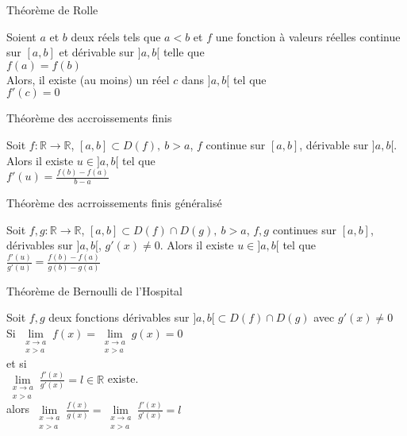 \documentclass[12pt]{article}
\newcommand*{\xfield}[1]{\begin{mdframed}\centering #1\end{mdframed}\bigskip}
\newenvironment{note}{}{}
\begin{document}
\begin{note}
	\xfield{Théorème de Rolle}
	\xfield{Soient $a$ et $b$ deux réels tels que $a < b$ et $f$ une fonction à valeurs réelles continue sur $[a, b]$ et dérivable sur $]a, b[$ telle que\\
$f(a)=f(b)$\\
Alors, il existe (au moins) un réel $c$ dans $]a, b[$ tel que\\
$f'(c)=0$ }
\end{note}

\begin{note}
	\xfield{Théorème des accroissements finis}
	\xfield{Soit $f : \mathbb{R} \rightarrow \mathbb{R}$, $[a,b] \subset D(f),\ b>a$, $f$ continue sur $[a,b]$, dérivable sur $]a,b[$. Alors il existe $u\in ]a,b[$ tel que\\
$f'(u)=\frac{f(b)-f(a)}{b-a}$}
\end{note}

\begin{note}
	\xfield{Théorème des acrroissements finis généralisé}
	\xfield{Soit $f,g : \mathbb{R} \rightarrow \mathbb{R}$, $[a,b] \subset D(f) \cap D(g),\ b>a$, $f,g$ continues sur $[a,b]$, dérivables sur $]a,b[$, $g'(x) \neq 0$. Alors il existe $u\in ]a,b[$ tel que\\
$\frac{f'(u)}{g'(u)}=\frac{f(b)-f(a)}{g(b)-g(a)}$}
\end{note}

\begin{note}
	\xfield{Théorème de Bernoulli de l'Hospital}
	\xfield{Soit $f,g$ deux fonctions dérivables sur $]a,b[ \subset D(f) \cap D(g)$ avec $g'(x) \neq 0$\\
	Si $\lim\limits_{\substack{x \to a\\ x > a}} f(x) = \lim\limits_{\substack{x \to a\\ x > a}} g(x) = 0$\\
	 et si \\
	 $\lim\limits_{\substack{x \to a\\ x > a}} \frac{f'(x)}{g'(x)} = l \in \mathbb{R}$ existe.\\
	 alors $\lim\limits_{\substack{x \to a\\ x > a}} \frac{f(x)}{g(x)} = \lim\limits_{\substack{x \to a\\ x > a}} \frac{f'(x)}{g'(x)} = l$
	 }
\end{note}
\end{document}
